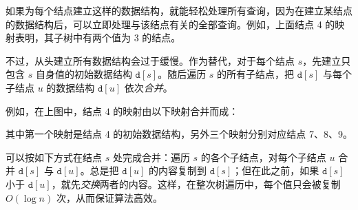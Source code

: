如果为每个结点建立这样的数据结构，就能轻松处理所有查询，因为在建立某结点的数据结构后，可以立即处理与该结点有关的全部查询。例如，上面结点 4 的映射表明，其子树中有两个值为 3 的结点。

不过，从头建立所有数据结构会过于缓慢。作为替代，对于每个结点 $s$，先建立只包含 $s$ 自身值的初始数据结构 $\texttt{d}[s]$。随后遍历 $s$ 的所有子结点，把 $\texttt{d}[s]$ 与每个子结点 $u$ 的数据结构 $\texttt{d}[u]$ 依次\emph{合并}。

例如，在上图中，结点 $4$ 的映射由以下映射合并而成：

\begin{center}
\end{center}

其中第一个映射是结点 4 的初始数据结构，另外三个映射分别对应结点 7、8、9。

可以按如下方式在结点 $s$ 处完成合并：遍历 $s$ 的各个子结点，对每个子结点 $u$ 合并 $\texttt{d}[s]$ 与 $\texttt{d}[u]$。总是把 $\texttt{d}[u]$ 的内容复制到 $\texttt{d}[s]$；但在此之前，如果 $\texttt{d}[s]$ 小于 $\texttt{d}[u]$，就先\emph{交换}两者的内容。这样，在整次树遍历中，每个值只会被复制 $O(\log n)$ 次，从而保证算法高效。

